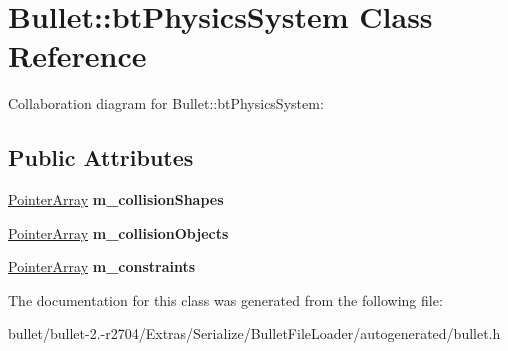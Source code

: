 \hypertarget{class_bullet_1_1bt_physics_system}{\section{Bullet\+:\+:bt\+Physics\+System Class Reference}
\label{class_bullet_1_1bt_physics_system}
}


Collaboration diagram for Bullet\+:\+:bt\+Physics\+System\+:
\subsection*{Public Attributes}
\begin{DoxyCompactItemize}
\item 
\hypertarget{class_bullet_1_1bt_physics_system_a851907a98b1ecd14d05992a23c00b33e}{\hyperlink{class_bullet_1_1_pointer_array}{Pointer\+Array} {\bfseries m\+\_\+collision\+Shapes}}\label{class_bullet_1_1bt_physics_system_a851907a98b1ecd14d05992a23c00b33e}

\item 
\hypertarget{class_bullet_1_1bt_physics_system_a83eae0f43650420095933cec748ada85}{\hyperlink{class_bullet_1_1_pointer_array}{Pointer\+Array} {\bfseries m\+\_\+collision\+Objects}}\label{class_bullet_1_1bt_physics_system_a83eae0f43650420095933cec748ada85}

\item 
\hypertarget{class_bullet_1_1bt_physics_system_acdcbf281ceea60c0d7f89323aa45ac99}{\hyperlink{class_bullet_1_1_pointer_array}{Pointer\+Array} {\bfseries m\+\_\+constraints}}\label{class_bullet_1_1bt_physics_system_acdcbf281ceea60c0d7f89323aa45ac99}

\end{DoxyCompactItemize}


The documentation for this class was generated from the following file\+:\begin{DoxyCompactItemize}
\item 
bullet/bullet-\/2.-\/r2704/\+Extras/\+Serialize/\+Bullet\+File\+Loader/autogenerated/bullet.\+h\end{DoxyCompactItemize}
